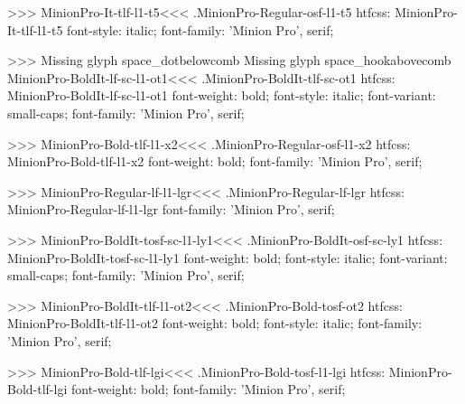 {>>>
\<MinionPro-It-tlf-l1-t5\><<<
.MinionPro-Regular-osf-l1-t5
htfcss:  MinionPro-It-tlf-l1-t5  font-style: italic; font-family: 'Minion Pro', serif;

>>>
Missing glyph	space_dotbelowcomb
Missing glyph	space_hookabovecomb
\<MinionPro-BoldIt-lf-sc-l1-ot1\><<<
.MinionPro-BoldIt-tlf-sc-ot1
htfcss:  MinionPro-BoldIt-lf-sc-l1-ot1  font-weight: bold; font-style: italic; font-variant: small-caps; font-family: 'Minion Pro', serif;

>>>
\<MinionPro-Bold-tlf-l1-x2\><<<
.MinionPro-Regular-osf-l1-x2
htfcss:  MinionPro-Bold-tlf-l1-x2  font-weight: bold; font-family: 'Minion Pro', serif;

>>>
\<MinionPro-Regular-lf-l1-lgr\><<<
.MinionPro-Regular-lf-lgr
htfcss:  MinionPro-Regular-lf-l1-lgr  font-family: 'Minion Pro', serif;

>>>
\<MinionPro-BoldIt-tosf-sc-l1-ly1\><<<
.MinionPro-BoldIt-osf-sc-ly1
htfcss:  MinionPro-BoldIt-tosf-sc-l1-ly1  font-weight: bold; font-style: italic; font-variant: small-caps; font-family: 'Minion Pro', serif;

>>>
\<MinionPro-BoldIt-tlf-l1-ot2\><<<
.MinionPro-Bold-tosf-ot2
htfcss:  MinionPro-BoldIt-tlf-l1-ot2  font-weight: bold; font-style: italic; font-family: 'Minion Pro', serif;

>>>
\<MinionPro-Bold-tlf-lgi\><<<
.MinionPro-Bold-tosf-l1-lgi
htfcss:  MinionPro-Bold-tlf-lgi  font-weight: bold; font-family: 'Minion Pro', serif;

}

